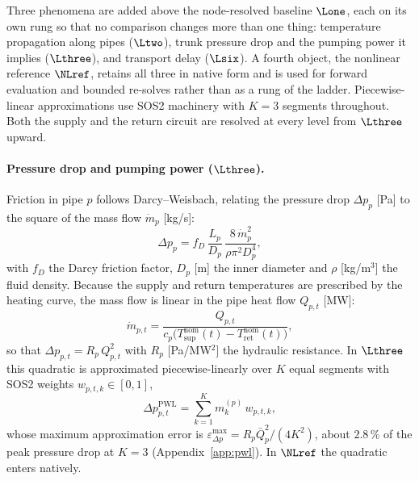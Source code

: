 
Three phenomena are added above the node-resolved baseline $\Lone$, each on its own rung so
that no comparison changes more than one thing: temperature propagation along pipes
($\Ltwo$), trunk pressure drop and the pumping power it implies ($\Lthree$), and transport
delay ($\Lsix$). A fourth object, the nonlinear reference $\NLref$, retains all three in
native form and is used for forward evaluation and bounded re-solves rather than as a rung
of the ladder. Piecewise-linear approximations use SOS2 machinery with $K = 3$ segments
throughout. Both the supply and the return circuit are resolved at every level from
$\Lthree$ upward.

\paragraph{Pressure drop and pumping power ($\Lthree$).}
Friction in pipe $p$ follows Darcy--Weisbach, relating the pressure drop $\Delta p_p$ [Pa]
to the square of the mass flow $\dot{m}_p$ [kg/s]:
%
\begin{equation}
  \Delta p_{p} = f_D\, \frac{L_p}{D_p}\,
    \frac{8\,\dot{m}_p^2}{\rho \pi^2 D_p^4},
  \label{eq:darcy}
\end{equation}
%
with $f_D$ the Darcy friction factor, $D_p$ [m] the inner diameter and $\rho$ [kg/m$^3$]
the fluid density. Because the supply and return temperatures are prescribed by the
heating curve, the mass flow is linear in the pipe heat flow $Q_{p,t}$ [MW]:
%
\begin{equation}
  \dot{m}_{p,t} = \frac{Q_{p,t}}{
    c_p \bigl(T_{\mathrm{sup}}^{\mathrm{nom}}(t)
    - T_{\mathrm{ret}}^{\mathrm{nom}}(t)\bigr)},
  \label{eq:massflow}
\end{equation}
%
so that $\Delta p_{p,t} = R_p\, Q_{p,t}^2$ with $R_p$ [Pa/MW$^2$] the hydraulic resistance.
In $\Lthree$ this quadratic is approximated piecewise-linearly over $K$ equal segments with
SOS2 weights $w_{p,t,k} \in [0,1]$,
%
\begin{equation}
  \Delta p_{p,t}^{\mathrm{PWL}} = \sum_{k=1}^{K}
    m_k^{(p)}\, w_{p,t,k},
  \label{eq:pressure_pwl}
\end{equation}
%
whose maximum approximation error is $\varepsilon^{\max}_{\Delta p} = R_p \bar{Q}_p^2/(4K^2)$,
about $2.8$\,\% of the peak pressure drop at $K = 3$ (Appendix~\ref{app:pwl}). In $\NLref$
the quadratic enters natively.


